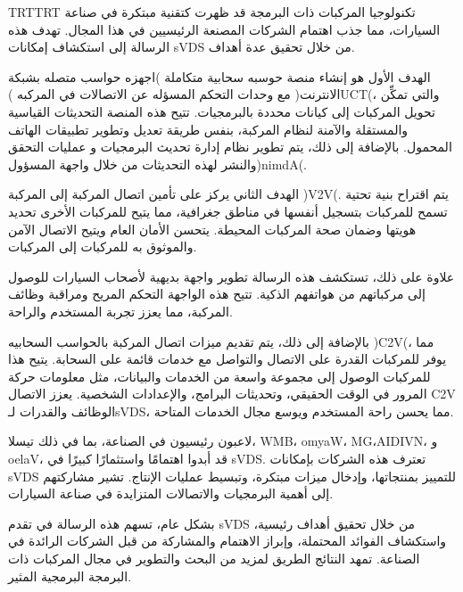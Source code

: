 \documentclass[
12pt,
oneside, 
onehalfspacing, 
nolistspacing, 
parskip, 
chapterinoneline, 
]{AASTCOMPUTER}
\newenvironment{Arabic}    
    {\textdir TRT\pardir TRT\arabicfont}{}
\begin{document}
\begin{arabicabstractp}
\begin{Arabic}
تكنولوجيا المركبات ذات البرمجة قد ظهرت كتقنية مبتكرة في صناعة السيارات، مما جذب اهتمام الشركات المصنعة الرئيسيين في هذا المجال. تهدف هذه الرسالة إلى استكشاف إمكانات sVDS من خلال تحقيق عدة أهداف.

الهدف الأول هو إنشاء منصة حوسبه سحابية متكاملة )اجهزه حواسب متصله بشبكة الانترنت( مع وحدات التحكم المسؤله عن الاتصالات في المركبه )UCT(، والتي تمكِّن تحويل المركبات إلى كيانات محددة بالبرمجيات. تتيح هذه المنصة التحديثات القياسية والمستقلة والآمنة لنظام المركبة، بنفس طريقة تعديل وتطوير تطبيقات الهاتف المحمول. بالإضافة إلى ذلك، يتم تطوير نظام إدارة تحديث البرمجيات و عمليات التحقق والنشر لهذه  التحديثات من خلال واجهة المسؤول)nimdA(.

الهدف الثاني يركز على تأمين اتصال المركبة إلى المركبة )V2V(. يتم اقتراح بنية تحتية تسمح للمركبات بتسجيل أنفسها في مناطق جغرافية، مما يتيح للمركبات الأخرى تحديد هويتها وضمان صحة المركبات المحيطة. يتحسن الأمان العام ويتيح الاتصال الآمن والموثوق به للمركبات إلى المركبات.

علاوة على ذلك، تستكشف هذه الرسالة تطوير واجهة بديهية لأصحاب السيارات للوصول إلى مركباتهم من هواتفهم الذكية. تتيح هذه الواجهة التحكم المريح ومراقبة وظائف المركبة، مما يعزز تجربة المستخدم والراحة.

بالإضافة إلى ذلك، يتم تقديم ميزات اتصال المركبة بالحواسب السحابيه )C2V(، مما يوفر للمركبات القدرة على الاتصال والتواصل مع خدمات قائمة على السحابة. يتيح هذا للمركبات الوصول إلى مجموعة واسعة من الخدمات والبيانات، مثل معلومات حركة المرور في الوقت الحقيقي، وتحديثات البرامج، والإعدادات الشخصية. يعزز الاتصال C2V الوظائف والقدرات لـsVDS، مما يحسن راحة المستخدم ويوسع مجال الخدمات المتاحة.

لاعبون رئيسيون في الصناعة، بما في ذلك تيسلا، WMB، omyaW، MG،AIDIVN، و oelaV، قد أبدوا اهتمامًا واستثمارًا كبيرًا في sVDS. تعترف هذه الشركات بإمكانات sVDS للتمييز بمنتجاتها، وإدخال ميزات مبتكرة، وتبسيط عمليات الإنتاج. تشير مشاركتهم إلى أهمية البرمجيات والاتصالات المتزايدة في صناعة السيارات.

بشكل عام، تسهم هذه الرسالة في تقدم sVDS من خلال تحقيق أهداف رئيسية، واستكشاف الفوائد المحتملة، وإبراز الاهتمام والمشاركة من قبل الشركات الرائدة في الصناعة. تمهد النتائج الطريق لمزيد من البحث والتطوير في مجال المركبات ذات البرمجة البرمجية المثير.
\end{Arabic}
\end{arabicabstractp}
\end{document}
